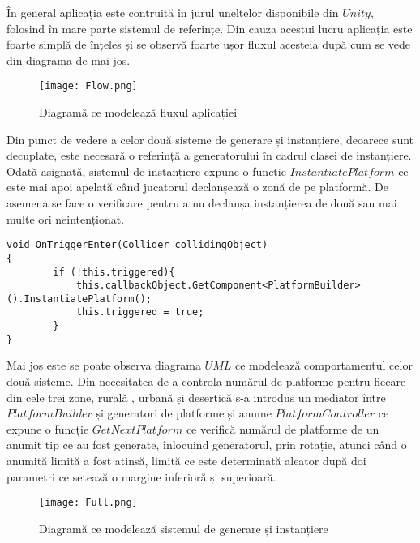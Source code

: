 În general aplicația este contruită în jurul uneltelor disponibile din $Unity$, folosind în mare parte sistemul de referințe. Din cauza acestui lucru aplicația este foarte simplă de înțeles și se observă foarte ușor fluxul acesteia după cum se vede din diagrama de mai jos.\par

\begin{figure}[H]
\centering
\texttt{[image: Flow.png]} \par
\caption{Diagramă ce modelează fluxul aplicației}
\end{figure}

Din punct de vedere a celor două sisteme de generare și instanțiere, deoarece sunt decuplate, este necesară o referință a generatorului în cadrul clasei de instanțiere. Odată asignată, sistemul de instanțiere expune o funcție $InstantiatePlatform$ ce este mai apoi apelată când jucatorul declanșează o zonă de pe platformă. De asemena se face o verificare pentru a nu declanșa instanțierea de două sau mai multe ori neintenționat.\par

\begin{lstlisting}[caption=Apelul de instanțiere a unei platforme]
void OnTriggerEnter(Collider collidingObject)
{
        if (!this.triggered){
            this.callbackObject.GetComponent<PlatformBuilder>().InstantiatePlatform();
            this.triggered = true;
        }
}
\end{lstlisting}

Mai jos este se poate observa diagrama $UML$ ce modelează comportamentul celor două sisteme. Din necesitatea de a controla numărul de platforme pentru fiecare din cele trei zone, rurală , urbană și desertică s-a introdus un mediator între $PlatformBuilder$ și generatori de platforme și anume $PlatformController$ ce expune o funcție $GetNextPlatform$ ce verifică numărul de platforme de un anumit tip ce au fost generate, înlocuind generatorul, prin rotație, atunci când o anumită limită a fost atinsă, limită ce este determinată aleator după doi parametri ce setează o margine inferioră și superioară.\par

\vspace{10mm}
\begin{figure}[H]
\centering
\texttt{[image: Full.png]} \par
\caption{Diagramă ce modelează sistemul de generare și instanțiere}
\end{figure}
